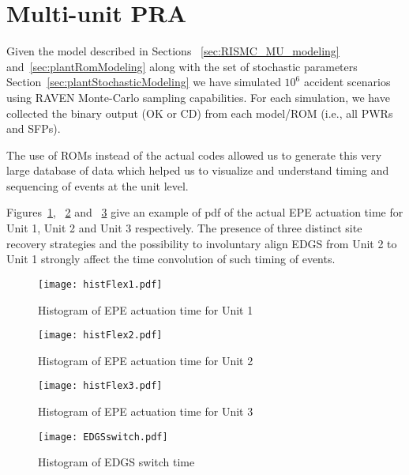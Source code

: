 \section{Multi-unit PRA}
\label{sec:multiUnitPRA}

Given the model described in Sections ~\ref{sec:RISMC_MU_modeling} and~\ref{sec:plantRomModeling} 
along with the set of stochastic parameters Section~\ref{sec:plantStochasticModeling} we have 
simulated $10^6$ accident scenarios using RAVEN Monte-Carlo sampling
capabilities. For each simulation, we have collected the binary output (OK or CD) from 
each model/ROM (i.e., all PWRs and SFPs).

The use of ROMs instead of the actual codes allowed us to generate this very large 
database of data which helped us to visualize and understand timing and sequencing of events at 
the unit level.

Figures~\ref{fig:histFlex1}, ~\ref{fig:histFlex2} and ~\ref{fig:histFlex3} give an example of pdf
of the actual EPE actuation time for Unit 1, Unit 2 and Unit 3 respectively. 
The presence of three distinct site recovery strategies and the possibility to involuntary align
EDGS from Unit 2 to Unit 1 strongly affect the time convolution of such timing of events. 

\begin{figure}
    \centering
    \texttt{[image: histFlex1.pdf]}
    \caption{Histogram of EPE actuation time for Unit 1}
    \label{fig:histFlex1}
\end{figure}

\begin{figure}
    \centering
    \texttt{[image: histFlex2.pdf]}
    \caption{Histogram of EPE actuation time for Unit 2}
    \label{fig:histFlex2}
\end{figure}

\begin{figure}
    \centering
    \texttt{[image: histFlex3.pdf]}
    \caption{Histogram of EPE actuation time for Unit 3}
    \label{fig:histFlex3}
\end{figure}

\begin{figure}
    \centering
    \texttt{[image: EDGSswitch.pdf]}
    \caption{Histogram of EDGS switch time}
    \label{fig:EDGSswitch}
\end{figure}